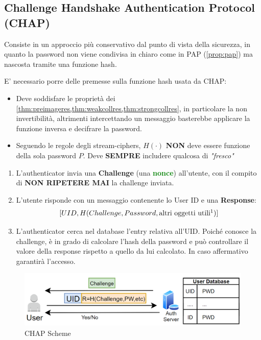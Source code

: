 \subsection{Challenge Handshake Authentication Protocol (CHAP)}
Consiste in un approccio più conservativo dal punto di vista della sicurezza, in quanto la password non viene condivisa in chiaro come in PAP (\cref{prop:pap}) ma nascosta tramite una funzione hash.
\begin{remark}
E' necessario porre delle premesse sulla funzione hash usata da CHAP:
\end{remark}
\begin{itemize}
    \item Deve soddisfare le proprietà dei \cref{thm:preimageres,thm:weakcollres,thm:strongcollres}, in particolare la non invertibilità, altrimenti intercettando un messaggio basterebbe applicare la funzione inversa e decifrare la password.
    \item Seguendo le regole degli stream-ciphers, $H(\cdot)$ \textbf{NON} deve essere funzione della sola password $P$. Deve \textbf{SEMPRE} includere qualcosa di \textit{"fresco"}\footnotemark
\end{itemize}
\begin{proposition}\label{prop:chap}
\begin{enumerate}
    \item L'authenticator invia una \textbf{Challenge} (una \textbf{\textcolor{green}{nonce}}) all'utente, con il compito di \textbf{NON RIPETERE MAI} la challenge inviata.
    \item L'utente risponde con un messaggio contenente lo User ID e una \textbf{Response}:
    \[[UID,H(Challenge, Password, \text{altri oggetti utili}\footnotemark)]\]
    \item L'authenticator cerca nel database l'entry relativa all'UID. Poiché conosce la challenge, è in grado di calcolare l'hash della password e può controllare il valore della response rispetto a quello da lui calcolato. In caso affermativo garantirà l’accesso.
\end{enumerate}
\end{proposition}
\begin{figure}[ht]
    \centering
    \includegraphics{image/chap.png}
    \caption{CHAP Scheme}
    \label{fig:chap}
\end{figure}
